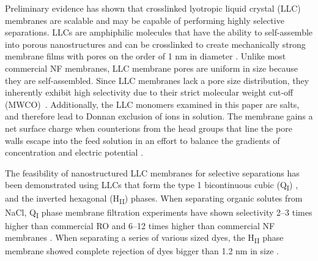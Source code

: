 \documentclass[journal=jpcbfk,manuscript=article]{achemso}
\begin{document}


  Preliminary evidence has shown that crosslinked lyotropic liquid crystal
  (LLC) membranes are scalable and may be capable of performing highly selective
  separations. LLCs are amphiphilic molecules that have the ability to
  self-assemble into porous nanostructures \cite{smith_ordered_1997} and can be
  crosslinked to create mechanically strong membrane films with pores on the
  order of 1 nm in diameter \cite{zhou_supported_2005}. Unlike most commercial NF
  membranes, LLC membrane pores are uniform in size because they are
  self-assembled. Since LLC membranes lack a pore size distribution, they
  inherently exhibit high selectivity due to their strict molecular weight
  cut-off (MWCO)~\cite{zhou_supported_2005}. Additionally, the LLC monomers
  examined in this paper are salts, and therefore lead to Donnan exclusion of
  ions in solution. The membrane gains a net surface charge when counterions from
  the head groups that line the pore walls escape into the feed solution in an
  effort to balance the gradients of concentration and electric potential
  \cite{donnan_theory_1995}.    

  The feasibility of nanostructured LLC membranes for selective separations has
  been demonstrated using LLCs that form the type 1 bicontinuous cubic
  (Q\textsubscript{I})
  \cite{hatakeyama_water_2011,hatakeyama_nanoporous_2010,carter_glycerol-based_2012},
  and the inverted hexagonal (H\textsubscript{II}) \cite{zhou_supported_2005}
  phases. When separating organic solutes from NaCl, Q\textsubscript{I} phase
  membrane filtration experiments have shown selectivity 2--3 times higher than
  commercial RO and 6--12 times higher than commercial NF membranes
  \cite{dischinger_application_2017}. When separating a series of various sized
  dyes, the H\textsubscript{II} phase membrane showed complete rejection of dyes
  bigger than 1.2 nm in size \cite{zhou_supported_2005}. 
\end{document}
